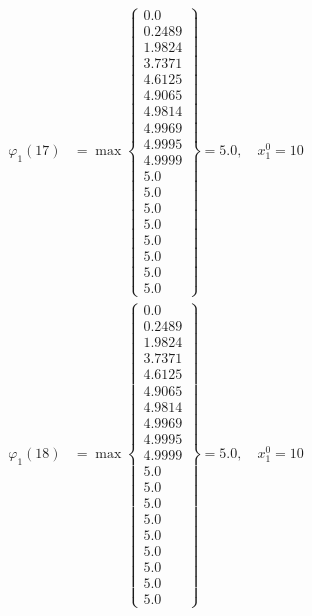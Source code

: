 \documentclass{article}
\begin{document}
\begin{align*}
\varphi_{1}(17) &= \max \left\{ \begin{array}{c}
0.0 \\
 0.2489 \\
 1.9824 \\
 3.7371 \\
 4.6125 \\
 4.9065 \\
 4.9814 \\
 4.9969 \\
 4.9995 \\
 4.9999 \\
 5.0 \\
 5.0 \\
 5.0 \\
 5.0 \\
 5.0 \\
 5.0 \\
 5.0 \\
 5.0
\end{array} \right\}=5.0, \quad x_{1}^0=10\\
  
\varphi_{1}(18) &= \max \left\{ \begin{array}{c}
0.0 \\
 0.2489 \\
 1.9824 \\
 3.7371 \\
 4.6125 \\
 4.9065 \\
 4.9814 \\
 4.9969 \\
 4.9995 \\
 4.9999 \\
 5.0 \\
 5.0 \\
 5.0 \\
 5.0 \\
 5.0 \\
 5.0 \\
 5.0 \\
 5.0 \\
 5.0
\end{array} \right\}=5.0, \quad x_{1}^0=10\\
  

\end{align*}
\end{document}
